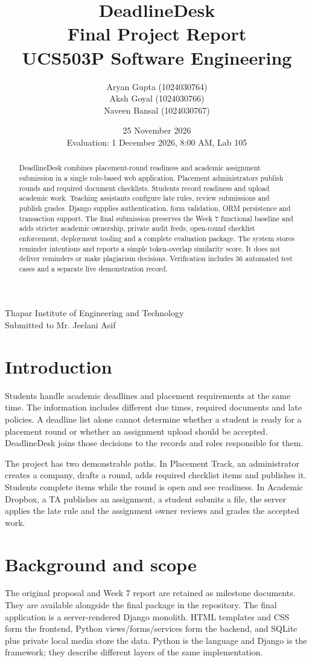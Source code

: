 \documentclass[11pt,a4paper]{article}
\title{DeadlineDesk\\Final Project Report\\\large UCS503P Software Engineering}
\author{Aryan Gupta (1024030764)\\Aksh Goyal (1024030766)\\Naveen Bansal (1024030767)}
\date{25 November 2026\\Evaluation: 1 December 2026, 8:00 AM, Lab 105}
\begin{document}
\maketitle
\begin{center}Thapar Institute of Engineering and Technology\\Submitted to Mr. Jeelani Asif\end{center}
\begin{abstract}
DeadlineDesk combines placement-round readiness and academic assignment submission in a single role-based web application. Placement administrators publish rounds and required document checklists. Students record readiness and upload academic work. Teaching assistants configure late rules, review submissions and publish grades. Django supplies authentication, form validation, ORM persistence and transaction support. The final submission preserves the Week 7 functional baseline and adds stricter academic ownership, private audit feeds, open-round checklist enforcement, deployment tooling and a complete evaluation package. The system stores reminder intentions and reports a simple token-overlap similarity score. It does not deliver reminders or make plagiarism decisions. Verification includes 36 automated test cases and a separate live demonstration record.
\end{abstract}
\tableofcontents
\clearpage
\section{Introduction}
Students handle academic deadlines and placement requirements at the same time. The information includes different due times, required documents and late policies. A deadline list alone cannot determine whether a student is ready for a placement round or whether an assignment upload should be accepted. DeadlineDesk joins those decisions to the records and roles responsible for them.

The project has two demonstrable paths. In Placement Track, an administrator creates a company, drafts a round, adds required checklist items and publishes it. Students complete items while the round is open and see readiness. In Academic Dropbox, a TA publishes an assignment, a student submits a file, the server applies the late rule and the assignment owner reviews and grades the accepted work.

\section{Background and scope}
The original proposal and Week 7 report are retained as milestone documents. They are available alongside the final package in the repository. The final application is a server-rendered Django monolith. HTML templates and CSS form the frontend, Python views/forms/services form the backend, and SQLite plus private local media store the data. Python is the language and Django is the framework; they describe different layers of the same implementation.
\end{document}
